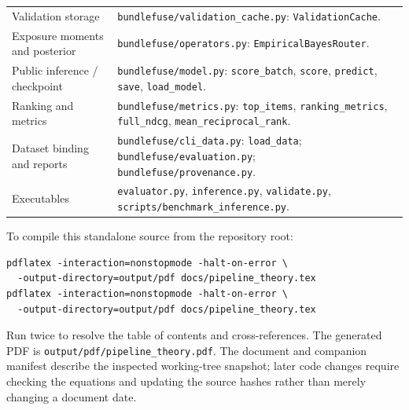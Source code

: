 \documentclass[11pt,a4paper]{article}
\newcommand{\code}[1]{\nolinkurl{#1}}
\numberwithin{equation}{section}
\begin{document}
\begin{longtable}{@{}>{\raggedright\arraybackslash}p{.26\linewidth}>{\raggedright\arraybackslash}p{.68\linewidth}@{}}
Validation storage & \code{bundlefuse/validation_cache.py}: \code{ValidationCache}. \\
Exposure moments and posterior & \code{bundlefuse/operators.py}: \code{EmpiricalBayesRouter}. \\
Public inference / checkpoint & \code{bundlefuse/model.py}: \code{score_batch}, \code{score}, \code{predict}, \code{save}, \code{load_model}. \\
Ranking and metrics & \code{bundlefuse/metrics.py}: \code{top_items}, \code{ranking_metrics}, \code{full_ndcg}, \code{mean_reciprocal_rank}. \\
Dataset binding and reports & \code{bundlefuse/cli_data.py}: \code{load_data}; \code{bundlefuse/evaluation.py}; \code{bundlefuse/provenance.py}. \\
Executables & \code{evaluator.py}, \code{inference.py}, \code{validate.py}, \code{scripts/benchmark_inference.py}. \\
\bottomrule
\end{longtable}
\normalsize
To compile this standalone source from the repository root:
\begin{lstlisting}
pdflatex -interaction=nonstopmode -halt-on-error \
  -output-directory=output/pdf docs/pipeline_theory.tex
pdflatex -interaction=nonstopmode -halt-on-error \
  -output-directory=output/pdf docs/pipeline_theory.tex
\end{lstlisting}
Run twice to resolve the table of contents and cross-references. The generated PDF is
\code{output/pdf/pipeline_theory.pdf}. The document and companion manifest describe the
inspected working-tree snapshot; later code changes require checking the equations and
updating the source hashes rather than merely changing a document date.
\end{document}
